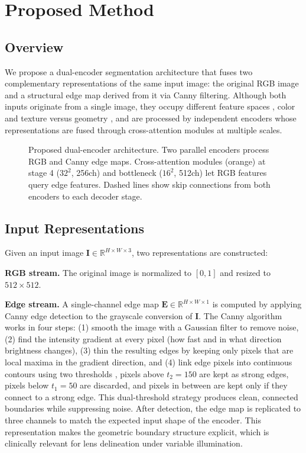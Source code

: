 \section{Proposed Method}

\subsection{Overview}

We propose a dual-encoder segmentation architecture that fuses two complementary representations of the same input image: the original RGB image and a structural edge map derived from it via Canny filtering. Although both inputs originate from a single image, they occupy different feature spaces ,  color and texture versus geometry ,  and are processed by independent encoders whose representations are fused through cross-attention modules at multiple scales.

\begin{figure}[h]
\centering
\resizebox{\columnwidth}{!}{%
    
}
\caption{Proposed dual-encoder architecture. Two parallel encoders process RGB and Canny edge maps. Cross-attention modules (orange) at stage 4 ($32^2$, 256ch) and bottleneck ($16^2$, 512ch) let RGB features query edge features. Dashed lines show skip connections from both encoders to each decoder stage.}
\label{fig:architecture}
\end{figure}

\subsection{Input Representations}

Given an input image $\mathbf{I} \in \mathbb{R}^{H \times W \times 3}$, two representations are constructed:

\textbf{RGB stream.} The original image is normalized to $[0, 1]$ and resized to $512 \times 512$.

\textbf{Edge stream.} A single-channel edge map $\mathbf{E} \in \mathbb{R}^{H \times W \times 1}$ is computed by applying Canny edge detection to the grayscale conversion of $\mathbf{I}$. The Canny algorithm works in four steps: (1) smooth the image with a Gaussian filter to remove noise, (2) find the intensity gradient at every pixel (how fast and in what direction brightness changes), (3) thin the resulting edges by keeping only pixels that are local maxima in the gradient direction, and (4) link edge pixels into continuous contours using two thresholds ,  pixels above $t_2 = 150$ are kept as strong edges, pixels below $t_1 = 50$ are discarded, and pixels in between are kept only if they connect to a strong edge. This dual-threshold strategy produces clean, connected boundaries while suppressing noise. After detection, the edge map is replicated to three channels to match the expected input shape of the encoder. This representation makes the geometric boundary structure explicit, which is clinically relevant for lens delineation under variable illumination.

